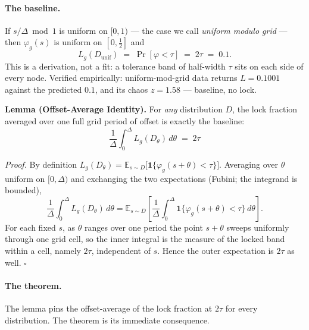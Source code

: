 \documentclass[11pt, letterpaper, openany]{book}
\begin{document}
\paragraph{The baseline.} If $s/\Delta \bmod 1$ is uniform on $[0,1)$ --- the case we call
\emph{uniform modulo grid} --- then $\varphi_g(s)$ is uniform on $[0,\tfrac12]$ and
\[
  L_g(D_{\text{unif}}) \;=\; \Pr[\varphi < \tau] \;=\; 2\tau \;=\; 0.1 .
\]
This is a derivation, not a fit: a tolerance band of half-width $\tau$ sits on each side of every
node. Verified empirically: uniform-mod-grid data returns $L = 0.1001$ against the predicted
$0.1$, and its chaos $z = 1.58$ --- baseline, no lock.
 
\begin{refutebox}
\textbf{Lemma (Offset-Average Identity).} For \emph{any} distribution $D$, the lock fraction
averaged over one full grid period of offset is exactly the baseline:
\[
  \boxed{\;\frac{1}{\Delta}\int_{0}^{\Delta} L_g(D_\theta)\, d\theta \;=\; 2\tau\;}
\]
 
\textit{Proof.} By definition $L_g(D_\theta) = \mathbb{E}_{s\sim D}\big[\mathbf{1}\{\varphi_g(s+\theta)<\tau\}\big]$.
Averaging over $\theta$ uniform on $[0,\Delta)$ and exchanging the two expectations (Fubini;
the integrand is bounded),
\[
  \frac{1}{\Delta}\int_0^\Delta L_g(D_\theta)\,d\theta
  = \mathbb{E}_{s\sim D}\!\left[\frac{1}{\Delta}\int_0^\Delta \mathbf{1}\{\varphi_g(s+\theta)<\tau\}\,d\theta\right].
\]
For each fixed $s$, as $\theta$ ranges over one period the point $s+\theta$ sweeps uniformly
through one grid cell, so the inner integral is the measure of the locked band within a cell,
namely $2\tau$, independent of $s$. Hence the outer expectation is $2\tau$ as well. \hfill$\square$
\end{refutebox}
 
\paragraph{The theorem.} The lemma pins the offset-average of the lock fraction at $2\tau$ for
every distribution. The theorem is its immediate consequence.
 
\end{document}
